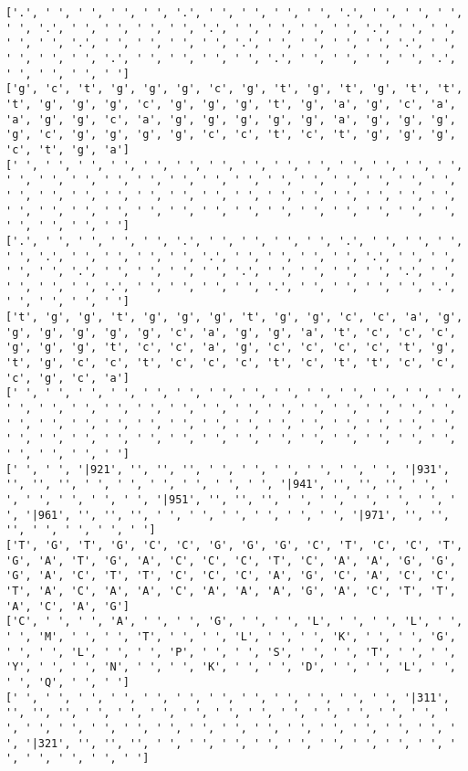 \documentclass{article}
\begin{document}
\begin{Verbatim}
['.', ' ', ' ', ' ', ' ', '.', ' ', ' ', ' ', ' ', '.', ' ', ' ', ' ', ' ', '.', ' ', ' ', ' ', ' ', '.', ' ', ' ', ' ', ' ', '.', ' ', ' ', ' ', ' ', '.', ' ', ' ', ' ', ' ', '.', ' ', ' ', ' ', ' ', '.', ' ', ' ', ' ', ' ', '.', ' ', ' ', ' ', ' ', '.', ' ', ' ', ' ', ' ', '.', ' ', ' ', ' ', ' ']
['g', 'c', 't', 'g', 'g', 'g', 'c', 'g', 't', 'g', 't', 'g', 't', 't', 't', 'g', 'g', 'g', 'c', 'g', 'g', 'g', 't', 'g', 'a', 'g', 'c', 'a', 'a', 'g', 'g', 'c', 'a', 'g', 'g', 'g', 'g', 'g', 'a', 'g', 'g', 'g', 'g', 'c', 'g', 'g', 'g', 'g', 'c', 'c', 't', 'c', 't', 'g', 'g', 'g', 'c', 't', 'g', 'a']
[' ', ' ', ' ', ' ', ' ', ' ', ' ', ' ', ' ', ' ', ' ', ' ', ' ', ' ', ' ', ' ', ' ', ' ', ' ', ' ', ' ', ' ', ' ', ' ', ' ', ' ', ' ', ' ', ' ', ' ', ' ', ' ', ' ', ' ', ' ', ' ', ' ', ' ', ' ', ' ', ' ', ' ', ' ', ' ', ' ', ' ', ' ', ' ', ' ', ' ', ' ', ' ', ' ', ' ', ' ', ' ', ' ', ' ', ' ', ' ']
['.', ' ', ' ', ' ', ' ', '.', ' ', ' ', ' ', ' ', '.', ' ', ' ', ' ', ' ', '.', ' ', ' ', ' ', ' ', '.', ' ', ' ', ' ', ' ', '.', ' ', ' ', ' ', ' ', '.', ' ', ' ', ' ', ' ', '.', ' ', ' ', ' ', ' ', '.', ' ', ' ', ' ', ' ', '.', ' ', ' ', ' ', ' ', '.', ' ', ' ', ' ', ' ', '.', ' ', ' ', ' ', ' ']
['t', 'g', 'g', 't', 'g', 'g', 'g', 't', 'g', 'g', 'c', 'c', 'a', 'g', 'g', 'g', 'g', 'g', 'g', 'c', 'a', 'g', 'g', 'a', 't', 'c', 'c', 'c', 'g', 'g', 'g', 't', 'c', 'c', 'a', 'g', 'c', 'c', 'c', 'c', 't', 'g', 't', 'g', 'c', 'c', 't', 'c', 'c', 'c', 't', 'c', 't', 't', 'c', 'c', 'c', 'g', 'c', 'a']
[' ', ' ', ' ', ' ', ' ', ' ', ' ', ' ', ' ', ' ', ' ', ' ', ' ', ' ', ' ', ' ', ' ', ' ', ' ', ' ', ' ', ' ', ' ', ' ', ' ', ' ', ' ', ' ', ' ', ' ', ' ', ' ', ' ', ' ', ' ', ' ', ' ', ' ', ' ', ' ', ' ', ' ', ' ', ' ', ' ', ' ', ' ', ' ', ' ', ' ', ' ', ' ', ' ', ' ', ' ', ' ', ' ', ' ', ' ', ' ']
[' ', ' ', '|921', '', '', '', ' ', ' ', ' ', ' ', ' ', ' ', '|931', '', '', '', ' ', ' ', ' ', ' ', ' ', ' ', '|941', '', '', '', ' ', ' ', ' ', ' ', ' ', ' ', '|951', '', '', '', ' ', ' ', ' ', ' ', ' ', ' ', '|961', '', '', '', ' ', ' ', ' ', ' ', ' ', ' ', '|971', '', '', '', ' ', ' ', ' ', ' ']
['T', 'G', 'T', 'G', 'C', 'C', 'G', 'G', 'G', 'C', 'T', 'C', 'C', 'T', 'G', 'A', 'T', 'G', 'A', 'C', 'C', 'C', 'T', 'C', 'A', 'A', 'G', 'G', 'G', 'A', 'C', 'T', 'T', 'C', 'C', 'C', 'A', 'G', 'C', 'A', 'C', 'C', 'T', 'A', 'C', 'A', 'A', 'C', 'A', 'A', 'A', 'G', 'A', 'C', 'T', 'T', 'A', 'C', 'A', 'G']
['C', ' ', ' ', 'A', ' ', ' ', 'G', ' ', ' ', 'L', ' ', ' ', 'L', ' ', ' ', 'M', ' ', ' ', 'T', ' ', ' ', 'L', ' ', ' ', 'K', ' ', ' ', 'G', ' ', ' ', 'L', ' ', ' ', 'P', ' ', ' ', 'S', ' ', ' ', 'T', ' ', ' ', 'Y', ' ', ' ', 'N', ' ', ' ', 'K', ' ', ' ', 'D', ' ', ' ', 'L', ' ', ' ', 'Q', ' ', ' ']
[' ', ' ', ' ', ' ', ' ', ' ', ' ', ' ', ' ', ' ', ' ', ' ', '|311', '', '', '', ' ', ' ', ' ', ' ', ' ', ' ', ' ', ' ', ' ', ' ', ' ', ' ', ' ', ' ', ' ', ' ', ' ', ' ', ' ', ' ', ' ', ' ', ' ', ' ', ' ', ' ', '|321', '', '', '', ' ', ' ', ' ', ' ', ' ', ' ', ' ', ' ', ' ', ' ', ' ', ' ', ' ', ' ']
  

\end{Verbatim}
\end{document}
